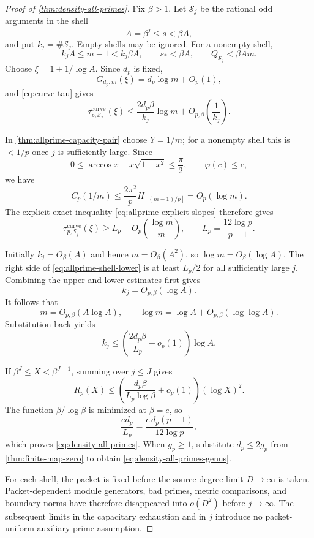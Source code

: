 \documentclass[11pt]{article}
\theoremstyle{definition}
\theoremstyle{remark}
\newcommand{\floor}[1]{\left\lfloor #1\right\rfloor}
\begin{document}
\begin{proof}[Proof of \cref{thm:density-all-primes}]
Fix $\beta>1$.  Let $\mathcal S_j$ be the rational odd arguments in the shell
\[
 A=\beta^j\le s<\beta A,
\]
and put $k_j=\#\mathcal S_j$.  Empty shells may be ignored.  For a nonempty
shell,
\[
 k_jA\le m-1<k_j\beta A,
 \qquad s_*<\beta A,
 \qquad Q_{\mathcal S_j}<\beta A m.
\]
Choose $\xi=1+1/\log A$.  Since $d_p$ is fixed,
\[
 G_{d_p,m}(\xi)=d_p\log m+O_p(1),
\]
and \eqref{eq:curve-tau} gives
\begin{equation}\label{eq:allprime-shell-upper}
 \tau^{\mathrm{curve}}_{p,\mathcal S_j}(\xi)
 \le\frac{2d_p\beta}{k_j}\log m
 +O_{p,\beta}\!\left(\frac1{k_j}\right).
\end{equation}

In \cref{thm:allprime-capacity-pair} choose $Y=1/m$; for a nonempty shell
this is $<1/p$ once $j$ is sufficiently large.  Since
\[
 0\le\arccos x-x\sqrt{1-x^2}\le\frac\pi2,
 \qquad \varphi(c)\le c,
\]
we have
\begin{equation}\label{eq:allprime-C-bound}
 C_p(1/m)
 \le\frac{2\pi^2}{p}
 H_{\floor{(m-1)/p}}
 =O_p(\log m).
\end{equation}
The explicit exact inequality \eqref{eq:allprime-explicit-slopes} therefore
gives
\begin{equation}\label{eq:allprime-shell-lower}
 \tau^{\mathrm{curve}}_{p,\mathcal S_j}(\xi)
 \ge L_p-O_p\!\left(\frac{\log m}{m}\right),
 \qquad
 L_p=\frac{12\log p}{p-1}.
\end{equation}

Initially $k_j=O_\beta(A)$ and hence $m=O_\beta(A^2)$, so
$\log m=O_\beta(\log A)$.  The right side of
\eqref{eq:allprime-shell-lower} is at least $L_p/2$ for all sufficiently large
$j$.  Combining the upper and lower estimates first gives
\[
 k_j=O_{p,\beta}(\log A).
\]
It follows that
\[
 m=O_{p,\beta}(A\log A),
 \qquad
 \log m=\log A+O_{p,\beta}(\log\log A).
\]
Substitution back yields
\begin{equation}\label{eq:allprime-shell-count}
 k_j\le
 \left(\frac{2d_p\beta}{L_p}+o_p(1)\right)\log A.
\end{equation}

If $\beta^J\le X<\beta^{J+1}$, summing over $j\le J$ gives
\begin{equation}\label{eq:allprime-explicit-constant}
 R_p(X)\le
 \left(\frac{d_p\beta}{L_p\log\beta}+o_p(1)\right)(\log X)^2.
\end{equation}
The function $\beta/\log\beta$ is minimized at $\beta=e$, so
\[
 \frac{ed_p}{L_p}=\frac{e\,d_p(p-1)}{12\log p},
\]
which proves \eqref{eq:density-all-primes}.  When $g_p\ge1$, substitute
$d_p\le2g_p$ from \cref{thm:finite-map-zero} to obtain
\eqref{eq:density-all-primes-genus}.

For each shell, the packet is fixed before the source-degree limit
$D\to\infty$ is taken.  Packet-dependent module generators, bad primes,
metric comparisons, and boundary norms have therefore disappeared into
$o(D^2)$ before $j\to\infty$.  The subsequent limits in the capacitary
exhaustion and in $j$ introduce no packet-uniform auxiliary-prime assumption.
\end{proof}
\end{document}
